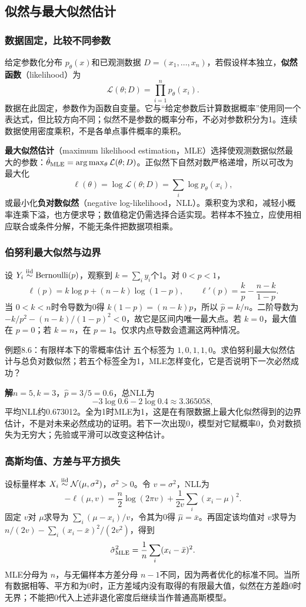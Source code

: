 \documentclass[UTF8,fontset=none,zihao=-4,a4paper]{ctexart}
\newcommand{\term}[1]{\textbf{#1}}
\newcommand{\sol}{\par\noindent\textbf{解}\quad}
\numberwithin{equation}{section}
\numberwithin{figure}{section}
\begin{document}
\subsection{似然与最大似然估计}
\subsubsection{数据固定，比较不同参数}
给定参数化分布 $p_\theta(x)$和已观测数据 $D=(x_1,\ldots,x_n)$，若假设样本独立，\term{似然函数}（likelihood）为
\[
 \mathcal L(\theta;D)=\prod_{i=1}^n p_\theta(x_i).
\]
数据在此固定，参数作为函数自变量。它与“给定参数后计算数据概率”使用同一个表达式，但比较方向不同；似然不是参数的概率分布，不必对参数积分为1。连续数据使用密度乘积，不是各单点事件概率的乘积。

\term{最大似然估计}（maximum likelihood estimation，MLE）选择使观测数据似然最大的参数：$\hat\theta_{\rm MLE}=\arg\max_\theta\mathcal L(\theta;D)$。正似然下自然对数严格递增，所以可改为最大化
\[
 \ell(\theta)=\log\mathcal L(\theta;D)=\sum_i\log p_\theta(x_i),
\]
或最小化\term{负对数似然}（negative log-likelihood，NLL）。乘积变为求和，减轻小概率连乘下溢，也方便求导；数值稳定仍需选择合适实现。若样本不独立，应使用相应联合或条件分解，不能无条件把数据项相乘。

\subsubsection{伯努利最大似然与边界}
设 $Y_i\overset{\rm iid}{\sim}\operatorname{Bernoulli}(p)$，观察到 $k=\sum_i y_i$个1。对 $0<p<1$，
\[
 \ell(p)=k\log p+(n-k)\log(1-p),\qquad
 \ell'(p)=\frac{k}{p}-\frac{n-k}{1-p}.
\]
当 $0<k<n$时令导数为0得 $k(1-p)=(n-k)p$，所以 $\hat p=k/n$。二阶导数为 $-k/p^2-(n-k)/(1-p)^2<0$，故它是区间内唯一最大点。若 $k=0$，最大值在 $p=0$；若 $k=n$，在 $p=1$。仅求内点导数会遗漏这两种情况。

\begin{infobox}{例题8.6：有限样本下的零概率估计}
五个标签为 $1,0,1,1,0$。求伯努利最大似然估计与总负对数似然；若五个标签全为1，MLE怎样变化，它是否说明下一次必然成功？
\end{infobox}
\sol $n=5,k=3$，$\hat p=3/5=0.6$，总NLL为
\[
 -3\log0.6-2\log0.4\approx3.365058,
\]
平均NLL约0.673012。全为1时MLE为1，这是在有限数据上最大化似然得到的边界估计，不是对未来必然成功的证明。若下一次出现0，模型对它赋概率0，负对数损失为无穷大；先验或平滑可以改变这种估计。

\subsubsection{高斯均值、方差与平方损失}
设标量样本 $X_i\overset{\rm iid}{\sim}\mathcal N(\mu,\sigma^2)$，$\sigma^2>0$。令 $v=\sigma^2$，NLL为
\[
 -\ell(\mu,v)=\frac n2\log(2\pi v)+\frac1{2v}\sum_i(x_i-\mu)^2.
\]
固定 $v$对 $\mu$求导为 $\sum_i(\mu-x_i)/v$，令其为0得 $\hat\mu=\bar x$。再固定该均值对 $v$求导为 $n/(2v)-\sum_i(x_i-\bar x)^2/(2v^2)$，得到
\[
 \hat\sigma^2_{\rm MLE}=\frac1n\sum_i(x_i-\bar x)^2.
\]
MLE分母为 $n$，与无偏样本方差分母 $n-1$不同，因为两者优化的标准不同。当所有数据相等、平方和为0时，正方差域内没有取得的有限最大值，似然在方差趋0时无界；不能把0代入上述非退化密度后继续当作普通高斯模型。
\end{document}
